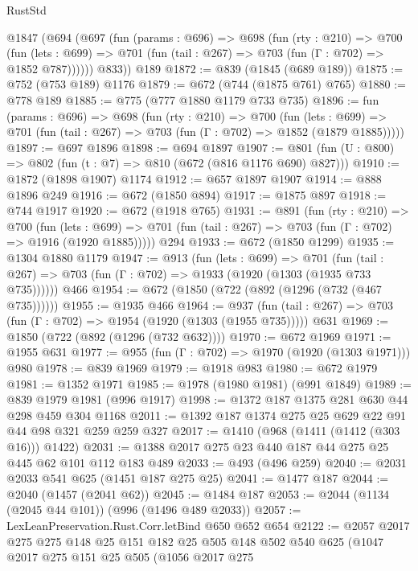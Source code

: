 \begin{lexlean}{RustStd}
\begin{coremodule}
{\begin{coremodule}
{{{{{{{    @1847
      (@694
        (@697
          (fun (params : @696) =>
          @698
            (fun (rty : @210) =>
            @700
              (fun (lets : @699) =>
              @701 (fun (tail : @267) => @703 (fun (Γ : @702) => @1852 @787))))))
        @833))
    @189
@1872 := @839 (@1845 (@689 @189))
@1875 := @752 (@753 @189) @1176
@1879 := @672 (@744 (@1875 @761) @765)
@1880 := @778 @189
@1885 := @775 (@777 @1880 @1179 @733 @735)
@1896 := fun (params : @696) =>
  @698
    (fun (rty : @210) =>
    @700
      (fun (lets : @699) =>
      @701 (fun (tail : @267) => @703 (fun (Γ : @702) => @1852 (@1879 @1885)))))
@1897 := @697 @1896
@1898 := @694 @1897
@1907 := @801 (fun (U : @800) => @802 (fun (t : @7) => @810 (@672 (@816 @1176 @690) @827)))
@1910 := @1872 (@1898 @1907) @1174
@1912 := @657 @1897 @1907
@1914 := @888 @1896 @249
@1916 := @672 (@1850 @894)
@1917 := @1875 @897
@1918 := @744 @1917
@1920 := @672 (@1918 @765)
@1931 := @891
    (fun (rty : @210) =>
    @700
      (fun (lets : @699) =>
      @701 (fun (tail : @267) => @703 (fun (Γ : @702) => @1916 (@1920 @1885)))))
    @294
@1933 := @672 (@1850 @1299)
@1935 := @1304 @1880 @1179
@1947 := @913
    (fun (lets : @699) =>
    @701 (fun (tail : @267) => @703 (fun (Γ : @702) => @1933 (@1920 (@1303 (@1935 @733 @735))))))
    @466
@1954 := @672 (@1850 (@722 (@892 (@1296 (@732 (@467 @735))))))
@1955 := @1935 @466
@1964 := @937
    (fun (tail : @267) => @703 (fun (Γ : @702) => @1954 (@1920 (@1303 (@1955 @735)))))
    @631
@1969 := @1850 (@722 (@892 (@1296 (@732 @632))))
@1970 := @672 @1969
@1971 := @1955 @631
@1977 := @955 (fun (Γ : @702) => @1970 (@1920 (@1303 @1971))) @980
@1978 := @839 @1969
@1979 := @1918 @983
@1980 := @672 @1979
@1981 := @1352 @1971
@1985 := @1978 (@1980 @1981) (@991 @1849)
@1989 := @839 @1979 @1981 (@996 @1917)
@1998 := @1372 @187 @1375 @281 @630 @44 @298 @459 @304 @1168
@2011 := @1392 @187 @1374 @275 @25 @629 @22 @91 @44 @98 @321 @259 @259 @327
@2017 := @1410 (@968 (@1411 (@1412 (@303 @16))) @1422)
@2031 := @1388 @2017 @275 @23 @440 @187 @44 @275 @25 @445 @62 @101 @112 @183 @489
@2033 := @493 (@496 @259)
@2040 := @2031 @2033 @541 @625 (@1451 @187 @275 @25)
@2041 := @1477 @187
@2044 := @2040 (@1457 (@2041 @62))
@2045 := @1484 @187
@2053 := @2044 (@1134 (@2045 @44 @101)) (@996 (@1496 @489 @2033))
@2057 := LexLeanPreservation.Rust.Corr.letBind @650 @652 @654
@2122 := @2057
    @2017
    @275
    @275
    @148
    @25
    @151
    @182
    @25
    @505
    @148
    @502
    @540
    @625
    (@1047
      @2017
      @275
      @151
      @25
      @505
      (@1056
        @2017
        @275
}}}}}}}
\end{coremodule}}
\end{coremodule}
\end{lexlean}
